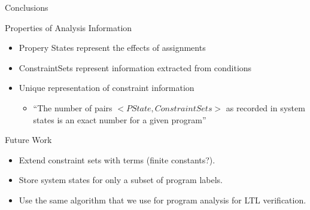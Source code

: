 \begin{frame}{Conclusions}

\begin{block}{Properties of Analysis Information}
\begin{itemize}
\item Propery States represent the effects of assignments
\item ConstraintSets represent information extracted from conditions
\item Unique representation of constraint information 
\begin{itemize}
\item ``The number of pairs $<PState,ConstraintSets>$ as recorded in system states is an exact number for a given program''
\end{itemize}
\end{itemize}
\end{block}

\begin{block}{Future Work}
\begin{itemize}
\item Extend constraint sets with terms (finite constants?).
\item Store system states for only a subset of program labels.
\item Use the same algorithm that we use for program analysis for LTL verification.
\end{itemize}
\end{block}

\end{frame}




